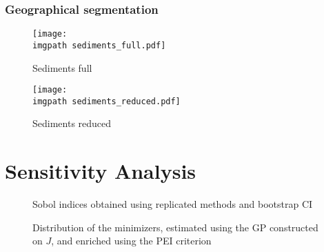 \documentclass[../../Main_ManuscritThese.tex]{subfiles}
\newcommand\imgpath{/home/victor/acadwriting/Manuscrit/Text/Chapter5/img/}
\begin{document}
\subsubsection{Geographical segmentation}
\begin{figure}[ht]
  \centering
  \texttt{[image: \\imgpath sediments\_full.pdf]}
  \caption{\label{fig:sediments_full} Sediments full}
\end{figure}

\begin{figure}[ht]
  \centering
  \texttt{[image: \\imgpath sediments\_reduced.pdf]}
  \caption{\label{fig:sediments_reduced} Sediments reduced}
\end{figure}

\section{Sensitivity Analysis}

\begin{figure}[ht]
  \centering
  
  \caption{\label{fig:sobol_indices} Sobol indices obtained using replicated methods and bootstrap CI}
\end{figure}

\begin{figure}[ht]
  \centering
  
  \caption{\label{fig:dist_minimizers} Distribution of the minimizers, estimated using the GP constructed on $J$, and enriched using the PEI criterion}
\end{figure}







\subfileLocal{
	\pagestyle{empty}
	
	
}
\end{document}
